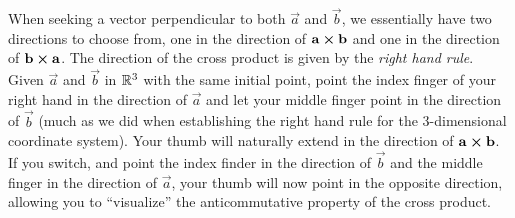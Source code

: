 \documentclass{ximera}
\begin{document}
When seeking a vector perpendicular to both $\vec a$ and $\vec b$, we
essentially have two directions to choose from, one in the direction
of $\mathbf{a}\boldsymbol\times\mathbf{b}$ and one in the direction of
$\mathbf{b}\boldsymbol\times\mathbf{a}$.  The direction of the cross product is given
by the \textit{right hand rule}.  Given $\vec{a}$ and $\vec{b}$ in
$\mathbb R^3$ with the same initial point, point the index finger of your
right hand in the direction of $\vec{a}$ and let your middle finger
point in the direction of $\vec{b}$ (much as we did when establishing
the right hand rule for the 3-dimensional coordinate system). Your
thumb will naturally extend in the direction of
$\mathbf{a}\boldsymbol\times\mathbf{b}$.  If you switch, and point the index finder in
the direction of $\vec{b}$ and the middle finger in the direction of
$\vec{a}$, your thumb will now point in the opposite direction,
allowing you to ``visualize'' the anticommutative property of the
cross product.
\end{document}
